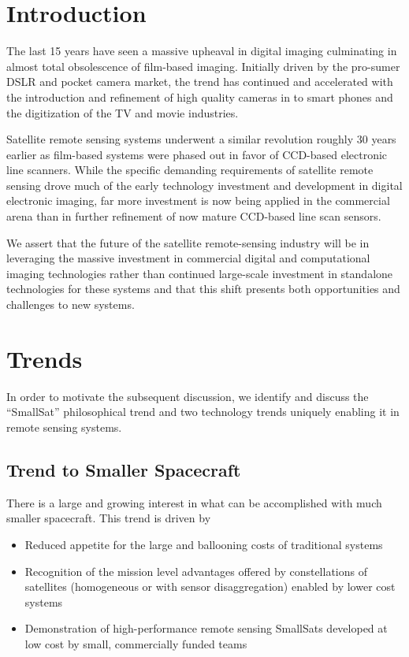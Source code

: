 \documentclass[10pt,journal]{IEEEtran}  %
\begin{document}
\IEEEdisplaynontitleabstractindextext

\tableofcontents

\section{Introduction}
\label{sec:introduction}

The last 15 years have seen a massive upheaval in digital imaging culminating in almost total obsolescence of film-based imaging.  Initially driven by the pro-sumer DSLR and pocket camera market, the trend has continued and accelerated with the introduction and refinement of high quality cameras in to smart phones and the digitization of the TV and movie industries.

Satellite remote sensing systems underwent a similar revolution roughly 30 years earlier as film-based systems were phased out in favor of CCD-based electronic line scanners.  While the specific demanding requirements of satellite remote sensing drove much of the early technology investment and development in digital electronic imaging, far more investment is now being applied in the commercial arena than in further refinement of now mature CCD-based line scan sensors.

We assert that the future of the satellite remote-sensing industry will be in leveraging the massive investment in commercial digital and computational imaging technologies rather than continued large-scale investment in standalone technologies for these systems and that this shift presents both opportunities and challenges to new systems.

\section{Trends}
In order to motivate the subsequent discussion, we identify and discuss the ``SmallSat'' philosophical trend and two technology trends uniquely enabling it in remote sensing systems.

\subsection{Trend to Smaller Spacecraft}

\label{sec:smallsat}
There is a large and growing interest in what can be accomplished with much smaller spacecraft.  This trend is driven by 
\begin{itemize}
    \item Reduced appetite for the large and ballooning costs of traditional systems
    \item Recognition of the mission level advantages offered by constellations of satellites (homogeneous or with sensor disaggregation) enabled by lower cost systems
    \item Demonstration of high-performance remote sensing SmallSats developed at low cost by small, commercially funded teams
\end{itemize} 
\end{document}
